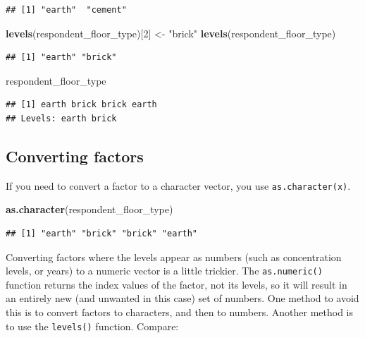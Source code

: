 \documentclass[]{book}
\newenvironment{Shaded}{\begin{snugshade}}{\end{snugshade}}
\newcommand{\KeywordTok}[1]{\textcolor[rgb]{0.13,0.29,0.53}{\textbf{#1}}}
\newcommand{\DecValTok}[1]{\textcolor[rgb]{0.00,0.00,0.81}{#1}}
\newcommand{\StringTok}[1]{\textcolor[rgb]{0.31,0.60,0.02}{#1}}
\newcommand{\NormalTok}[1]{#1}
\begin{document}
\begin{verbatim}
## [1] "earth"  "cement"
\end{verbatim}

\begin{Shaded}
\begin{Highlighting}[]
\KeywordTok{levels}\NormalTok{(respondent_floor_type)[}\DecValTok{2}\NormalTok{] <-}\StringTok{ "brick"}
\KeywordTok{levels}\NormalTok{(respondent_floor_type)}
\end{Highlighting}
\end{Shaded}

\begin{verbatim}
## [1] "earth" "brick"
\end{verbatim}

\begin{Shaded}
\begin{Highlighting}[]
\NormalTok{respondent_floor_type}
\end{Highlighting}
\end{Shaded}

\begin{verbatim}
## [1] earth brick brick earth
## Levels: earth brick
\end{verbatim}

\subsection{Converting factors}\label{converting-factors}

If you need to convert a factor to a character vector, you use
\texttt{as.character(x)}.

\begin{Shaded}
\begin{Highlighting}[]
\KeywordTok{as.character}\NormalTok{(respondent_floor_type)}
\end{Highlighting}
\end{Shaded}

\begin{verbatim}
## [1] "earth" "brick" "brick" "earth"
\end{verbatim}

Converting factors where the levels appear as numbers (such as
concentration levels, or years) to a numeric vector is a little
trickier. The \texttt{as.numeric()} function returns the index values of
the factor, not its levels, so it will result in an entirely new (and
unwanted in this case) set of numbers. One method to avoid this is to
convert factors to characters, and then to numbers. Another method is to
use the \texttt{levels()} function. Compare:
\end{document}
